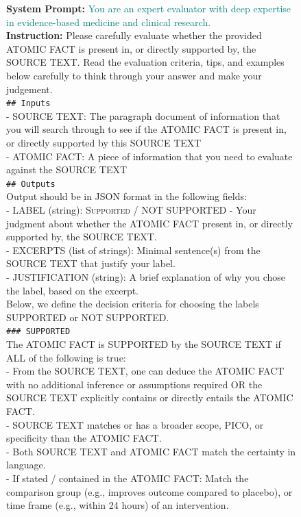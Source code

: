 \documentclass{article}
\begin{document}
\clearpage

\begin{figure}[t]
\begin{small}
\centering
\begin{tcolorbox}[
    colback=gray!5,
    colframe=black,
    width=\linewidth,
    arc=2mm,
    boxrule=0.5pt,
    title=\textbf{LLM Judge Prompt for Factual Recall Evaluation}
]
\textbf{System Prompt:} \textcolor{teal}{You are an expert evaluator with deep expertise in evidence-based medicine and clinical research.}\\

\textbf{Instruction:} Please carefully evaluate whether the provided ATOMIC FACT is present in, or directly supported by, the SOURCE TEXT. Read the evaluation criteria, tips, and examples below carefully to think through your answer and make your judgement.\\


\texttt{\#\# Inputs}\\
- SOURCE TEXT: The paragraph document of information that you will search through to see if the ATOMIC FACT is present in, or directly supported by this SOURCE TEXT\\
- ATOMIC FACT: A piece of information that you need to evaluate against the SOURCE TEXT\\

\texttt{\#\# Outputs}\\
Output should be in JSON format in the following fields:\\
- LABEL (string): \textsc{Supported} / \textsc{NOT SUPPORTED} - Your judgment about whether the ATOMIC FACT present in, or directly supported by, the SOURCE TEXT.\\
- EXCERPTS (list of strings): Minimal sentence(s) from the SOURCE TEXT that justify your label. \\
- JUSTIFICATION (string): A brief explanation of why you chose the label, based on the excerpt.\\

Below, we define the decision criteria for choosing the labels SUPPORTED or NOT SUPPORTED.\\

\texttt{\#\#\# SUPPORTED} \\
The ATOMIC FACT is SUPPORTED by the SOURCE TEXT if ALL of the following is true:\\
- From the SOURCE TEXT, one can deduce the ATOMIC FACT with no additional inference or assumptions required OR the SOURCE TEXT explicitly contains or directly entails the ATOMIC FACT.\\
- SOURCE TEXT matches or has a broader scope, PICO, or specificity than the ATOMIC FACT. \\
- Both SOURCE TEXT and ATOMIC FACT match the certainty in language.\\
- If stated / contained in the ATOMIC FACT: Match the comparison group (e.g., improves outcome compared to placebo), or time frame (e.g., within 24 hours) of an intervention.\\


\end{tcolorbox}
\end{small}
\end{figure}
\end{document}
